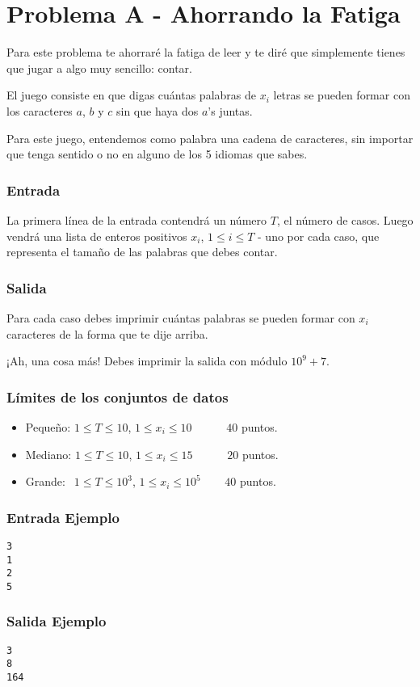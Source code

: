 \chapter*{Problema A - Ahorrando la Fatiga}

Para este problema te ahorraré la fatiga de leer y te diré 
que simplemente tienes que jugar a algo muy sencillo:
contar.

El juego consiste en que digas cuántas palabras de $x_i$
letras se pueden formar con los caracteres $a$, $b$ y $c$ 
sin que haya dos $a$'s juntas.

Para este juego, entendemos como palabra una cadena de 
caracteres, sin importar que tenga sentido o no en alguno
de los 5 idiomas que sabes.



\subsection*{Entrada}
La primera línea de la entrada contendrá un número $T$, 
el número de casos. Luego vendrá una lista de enteros 
positivos $x_i$, $1 \leq i \leq T$ - uno por cada caso, 
que representa el tamaño de las palabras que debes contar.



\subsection*{Salida}
Para cada caso debes imprimir cuántas palabras se pueden
formar con $x_i$ caracteres de la forma que te dije arriba.

¡Ah, una cosa más! Debes imprimir la salida con módulo 
$10^9+7$.



\subsection*{Límites de los conjuntos de datos}

\begin{itemize}
    \item Pequeño: $ 1 \leq T \leq 10 $, $ 1 \leq x_i
    \leq 10$   $\quad \;\;\;\;\;$ $40$ puntos.
    \item Mediano: $ 1 \leq T \leq 10 $, $ 1 \leq x_i
    \leq 15$   $\quad \;\;\;\;\;$ $20$ puntos.
    \item Grande: $ \;\, 1 \leq T \leq 10^{3}$, $ 1 
    \leq x_i \leq 10^5 $ $\quad \;\,$ $40$ puntos.
\end{itemize}



\begin{multicols}{2}

\subsection*{Entrada Ejemplo}

\begin{verbatim}
3
1
2
5
\end{verbatim}

\columnbreak

\subsection*{Salida Ejemplo}

\begin{verbatim}
3
8
164
\end{verbatim}

\end{multicols}